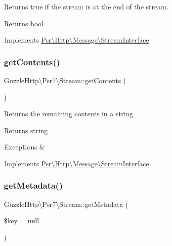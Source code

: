 Returns true if the stream is at the end of the stream.

\begin{DoxyReturn}{Returns}
bool 
\end{DoxyReturn}


Implements \hyperlink{interfacePsr_1_1Http_1_1Message_1_1StreamInterface_a502cc5ca370c6925b78d95d86d68777c}{Psr\textbackslash{}\+Http\textbackslash{}\+Message\textbackslash{}\+Stream\+Interface}.

\mbox{\label{classGuzzleHttp_1_1Psr7_1_1Stream_a60de62d579dc9e4677452a91b7c4a336}} 
\subsubsection{\texorpdfstring{get\+Contents()}{getContents()}}
{\footnotesize\ttfamily Guzzle\+Http\textbackslash{}\+Psr7\textbackslash{}\+Stream\+::get\+Contents (\begin{DoxyParamCaption}{ }\end{DoxyParamCaption})}

Returns the remaining contents in a string

\begin{DoxyReturn}{Returns}
string 
\end{DoxyReturn}

\begin{DoxyExceptions}{Exceptions}
{\em } & \\
\hline
\end{DoxyExceptions}


Implements \hyperlink{interfacePsr_1_1Http_1_1Message_1_1StreamInterface_a77f73d536f77e4a4e281d548ee905276}{Psr\textbackslash{}\+Http\textbackslash{}\+Message\textbackslash{}\+Stream\+Interface}.

\mbox{\label{classGuzzleHttp_1_1Psr7_1_1Stream_a35f44d3d2b973f128c493f7359c42dbb}} 
\subsubsection{\texorpdfstring{get\+Metadata()}{getMetadata()}}
{\footnotesize\ttfamily Guzzle\+Http\textbackslash{}\+Psr7\textbackslash{}\+Stream\+::get\+Metadata (\begin{DoxyParamCaption}\item[{}]{\$key = {\ttfamily null} }\end{DoxyParamCaption})}


